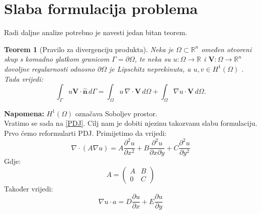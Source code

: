 \documentclass[zavrsnirad]{../fer}
\newtheorem{teorem}{Teorem}
\begin{document}
\section{Slaba formulacija problema}
\label{slabaFormulacija}
Radi daljne analize potrebno je navesti jedan bitan 
teorem.
\\ 
\begin{teorem}[Pravilo za divergenciju produkta]
\label{tm1}
Neka je $\Omega \subset \mathbb{R}^n$ omeđen otvoreni
skup s komadno glatkom granicom $\Gamma = \partial \Omega$,
te neka su $u : \Omega \to \mathbb{R}$ i $\mathbf{V} : \Omega \to \mathbb{R}^n$ 
dovoljne regularnosti odnosno $\partial \Omega$ je
Lipschitz neprekinuta, a $u,v \in H^1(\Omega)$
. Tada vrijedi:
\[
\int_{\Gamma} u \mathbf{V} \cdot \hat{\mathbf{n}} \, d\Gamma = 
\int_{\Omega} u \, \nabla \cdot \mathbf{V} \, d\Omega + 
\int_{\Omega} \nabla u \cdot \mathbf{V} \, d\Omega.
\]
\end{teorem}
\textbf{Napomena:} $H^1(\Omega)$ označava Soboljev prostor.
\bigskip
\\ 
Vratimo se sada na \ref{PDJ}.
Cilj nam je dobiti njezinu takozvanu slabu formulaciju.
Prvo ćemo reformularti PDJ. Primijetimo da vrijedi:
$$\nabla \cdot (A \nabla u) = 
  A \frac{\partial^2 u}{\partial x^2}
	+ B \frac{\partial^2 u}{\partial x \partial y}
	+ C \frac{\partial^2 u}{\partial y^2}
$$
Gdje:
$$A = 
\begin{pmatrix}
  A & B \\ 
  0 & C
\end{pmatrix}
 $$
 Također vrijedi:
 $$ \nabla u \cdot a =
 D \frac{\partial u}{\partial x}
	+ E \frac{\partial u}{\partial y} $$
\end{document}
